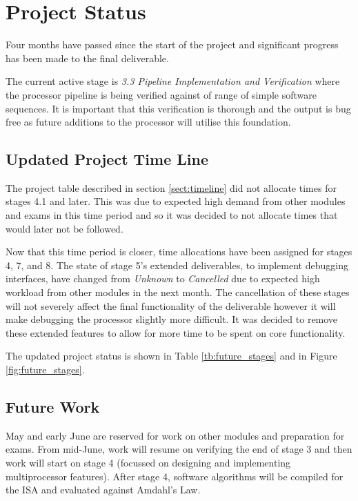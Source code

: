 \documentclass[11pt,a4paper]{report}
\begin{document}
{\section{Project Status}
Four months have passed since the start of the project and significant progress has been made to the final deliverable. 

The current active stage is \textit{3.3 Pipeline Implementation and Verification} where the processor pipeline is being verified against of range of simple software sequences. It is important that this verification is thorough and the output is bug free as future additions to the processor will utilise this foundation.

\subsection{Updated Project Time Line}
The project table described in section \ref{sect:timeline} did not allocate times for stages 4.1 and later. This was due to expected high demand from other modules and exams in this time period and so it was decided to not allocate times that would later not be followed.

Now that this time period is closer, time allocations have been assigned for stages 4, 7, and 8. The state of stage 5's extended deliverables, to implement debugging interfaces, have changed from \textit{Unknown} to \textit{Cancelled} due to expected high workload from other modules in the next month. The cancellation of these stages will not severely affect the final functionality of the deliverable however it will make debugging the processor slightly more difficult. It was decided to remove these extended features to allow for more time to be spent on core functionality.

The updated project status is shown in Table \ref{tb:future_stages} and in Figure \ref{fig:future_stages}.


\subsection{Future Work}
May and early June are reserved for work on other modules and preparation for exams. From mid-June, work will resume on verifying the end of stage 3 and then work will start on stage 4 (focussed on designing and implementing multiprocessor features). After stage 4, software algorithms will be compiled for the ISA and evaluated against Amdahl's Law.

}
\end{document}
